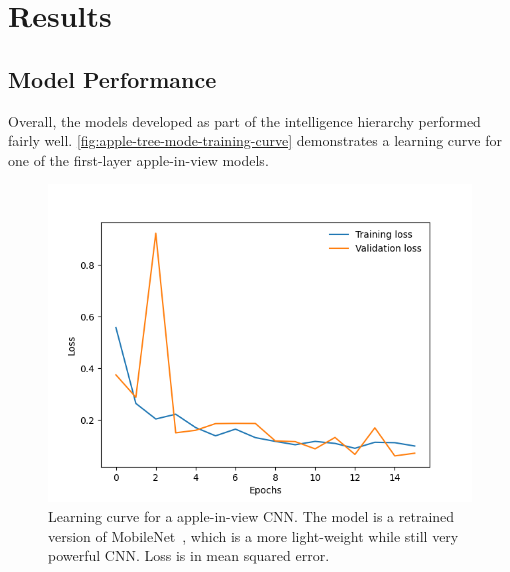 \section{Results}
\subsection{Model Performance}\label{subsec:model-performance}
Overall, the models developed as part of the intelligence hierarchy performed fairly well.
\autoref{fig:apple-tree-mode-training-curve} demonstrates a learning curve for one of the first-layer apple-in-view models.


\begin{figure}[!htb]
    \centering
    \includegraphics[width=\columnwidth,keepaspectratio]
    {./figures/mobile_model_apple_trees_16its_2022-11-15_training_curve}
    \caption{
        Learning curve for a apple-in-view CNN.
        The model is a retrained version of MobileNet~\cite{Sandler2018,PyTorchMobileNet}, which is a more light-weight while still very powerful CNN.
        Loss is in mean squared error.
    }
    \label{fig:apple-tree-mode-training-curve}
\end{figure}



